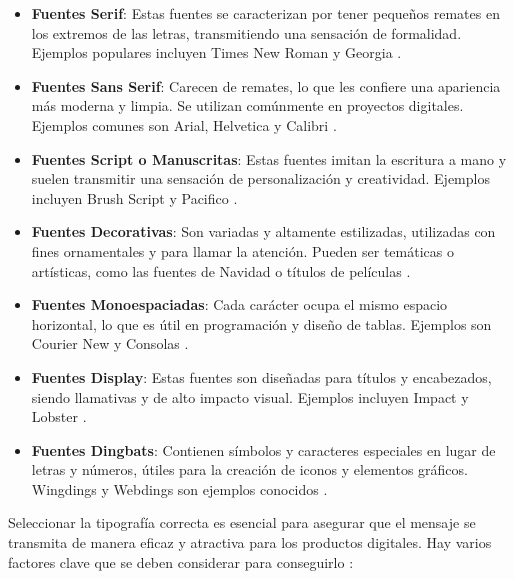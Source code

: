 \begin{itemize}
    \item \textbf{Fuentes Serif}: Estas fuentes se caracterizan por tener pequeños remates en los extremos de las letras, transmitiendo una sensación de formalidad. Ejemplos populares incluyen Times New Roman y Georgia \cite{CamaraSevilla2023}.
    \item \textbf{Fuentes Sans Serif}: Carecen de remates, lo que les confiere una apariencia más moderna y limpia. Se utilizan comúnmente en proyectos digitales. Ejemplos comunes son Arial, Helvetica y Calibri \cite{CamaraSevilla2023}.
    \item \textbf{Fuentes Script o Manuscritas}: Estas fuentes imitan la escritura a mano y suelen transmitir una sensación de personalización y creatividad. Ejemplos incluyen Brush Script y Pacifico \cite{CamaraSevilla2023}.
    \item \textbf{Fuentes Decorativas}: Son variadas y altamente estilizadas, utilizadas con fines ornamentales y para llamar la atención. Pueden ser temáticas o artísticas, como las fuentes de Navidad o títulos de películas \cite{CamaraSevilla2023}.
    \item \textbf{Fuentes Monoespaciadas}: Cada carácter ocupa el mismo espacio horizontal, lo que es útil en programación y diseño de tablas. Ejemplos son Courier New y Consolas \cite{CamaraSevilla2023}.
    \item \textbf{Fuentes Display}: Estas fuentes son diseñadas para títulos y encabezados, siendo llamativas y de alto impacto visual. Ejemplos incluyen Impact y Lobster \cite{CamaraSevilla2023}.
    \item \textbf{Fuentes Dingbats}: Contienen símbolos y caracteres especiales en lugar de letras y números, útiles para la creación de iconos y elementos gráficos. Wingdings y Webdings son ejemplos conocidos \cite{CamaraSevilla2023}.
\end{itemize}

Seleccionar la tipografía correcta es esencial para asegurar que el mensaje se transmita de manera eficaz y atractiva para los productos digitales. Hay varios factores clave que se deben considerar para conseguirlo \cite{CamaraSevilla2023}:

